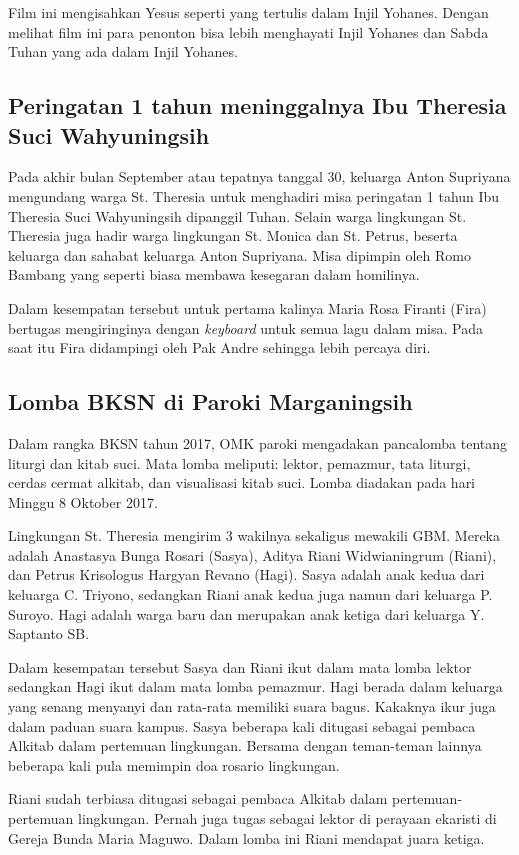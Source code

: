 Film ini mengisahkan Yesus seperti yang tertulis dalam Injil Yohanes. Dengan melihat film ini para penonton bisa lebih menghayati Injil Yohanes dan Sabda Tuhan yang ada dalam Injil Yohanes. 

\subsection*{Peringatan 1 tahun meninggalnya Ibu Theresia Suci Wahyuningsih}
Pada akhir bulan September atau tepatnya tanggal 30, keluarga Anton Supriyana mengundang warga St. Theresia untuk menghadiri misa peringatan 1 tahun Ibu Theresia Suci Wahyuningsih dipanggil Tuhan. Selain warga lingkungan St. Theresia juga hadir warga lingkungan St. Monica dan St. Petrus, beserta keluarga dan sahabat keluarga Anton Supriyana. Misa dipimpin oleh Romo Bambang yang seperti biasa membawa kesegaran dalam homilinya.

Dalam kesempatan tersebut untuk pertama kalinya Maria Rosa Firanti (Fira) bertugas mengiringinya dengan \textit{keyboard} untuk semua lagu dalam misa. Pada saat itu Fira didampingi oleh Pak Andre sehingga lebih percaya diri.


\subsection*{Lomba BKSN di Paroki Marganingsih}
Dalam rangka BKSN tahun 2017, OMK paroki mengadakan pancalomba tentang liturgi dan kitab suci. Mata lomba meliputi: lektor, pemazmur, tata liturgi, cerdas cermat alkitab, dan visualisasi kitab suci. Lomba diadakan pada hari Minggu 8 Oktober 2017.

Lingkungan St. Theresia mengirim 3 wakilnya sekaligus mewakili GBM.  Mereka adalah Anastasya Bunga Rosari (Sasya), 
Aditya Riani Widwianingrum (Riani), dan 
Petrus Krisologus Hargyan Revano (Hagi).
Sasya adalah anak kedua dari keluarga C. Triyono, sedangkan Riani anak kedua juga namun dari keluarga P. Suroyo. Hagi adalah warga baru dan merupakan anak ketiga dari keluarga Y. Saptanto SB.

Dalam kesempatan tersebut Sasya dan Riani ikut dalam mata lomba lektor sedangkan Hagi ikut dalam mata lomba pemazmur. Hagi berada dalam keluarga yang senang menyanyi dan rata-rata memiliki suara bagus. Kakaknya ikur juga dalam paduan suara kampus. Sasya beberapa kali ditugasi sebagai pembaca Alkitab dalam pertemuan lingkungan. Bersama dengan teman-teman lainnya beberapa kali pula memimpin doa rosario lingkungan.

Riani sudah terbiasa ditugasi sebagai pembaca Alkitab dalam pertemuan-pertemuan lingkungan. Pernah juga tugas sebagai lektor di perayaan ekaristi di Gereja Bunda Maria Maguwo. Dalam lomba ini Riani mendapat juara ketiga. 

